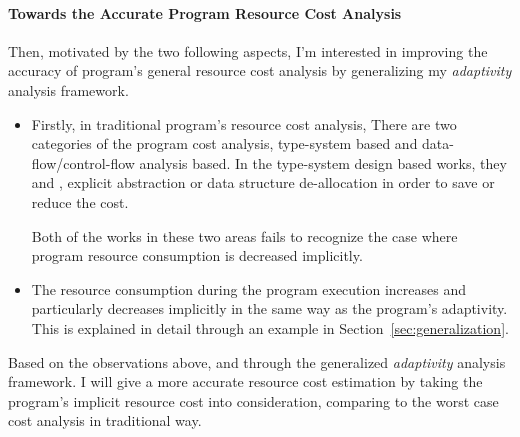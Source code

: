 \paragraph*{Towards the Accurate Program Resource Cost Analysis}
Then, motivated by the two following aspects,  I'm interested in improving the accuracy of program's general resource cost analysis
by generalizing my \emph{adaptivity} analysis framework.
\begin{itemize}
    \item Firstly, in traditional program's resource cost analysis,
    There are two categories of the program cost analysis, type-system based  and data-flow/control-flow analysis based. 
    In the type-system design based works, they \cite{GustafssonEL05} and \cite{hoffmann_jost_2022}, explicit abstraction or data structure de-allocation in order to save or reduce the cost.
    
    Both of the
    works in these two areas fails to recognize the case where program resource consumption is decreased implicitly.
    \item The resource consumption during the program 
    execution increases and particularly decreases implicitly in the same way as the program's adaptivity. This is explained in detail through an example in Section~\ref*{sec:generalization}.
\end{itemize}
   Based on the observations above, and through the generalized \emph{adaptivity} analysis framework.
   I will give
   a more accurate resource cost estimation by taking the program's implicit resource cost into consideration, comparing 
   to the worst case cost analysis in traditional way.


